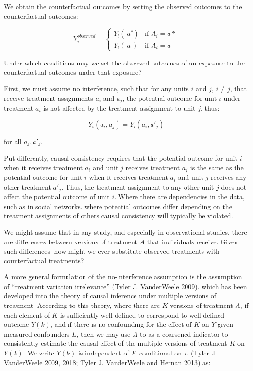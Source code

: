 \documentclass[
  singlecolumn]{report}
\begin{document}
We obtain the counterfactual outcomes by setting the observed outcomes
to the counterfactual outcomes:

\[
Y^{observed}_i = 
\begin{cases} 
Y_i(~a^*) & \text{if } A_i = a* \\
Y_i(~a~) & \text{if } A_i = a
\end{cases}
\]

Under which conditions may we set the observed outcomes of an exposure
to the counterfactual outcomes under that exposure?

First, we must assume no interference, such that for any units \(i\) and
\(j\), \(i \neq j\), that receive treatment assignments \(a_i\) and
\(a_j\), the potential outcome for unit \(i\) under treatment \(a_i\) is
not affected by the treatment assignment to unit \(j\), thus:

\[Y_i(a_i, a_j) = Y_i(a_i, a'_j)\]

for all \(a_j, a'_j\).

Put differently, causal consistency requires that the potential outcome
for unit \(i\) when it receives treatment \(a_i\) and unit \(j\)
receives treatment \(a_j\) is the same as the potential outcome for unit
\(i\) when it receives treatment \(a_i\) and unit \(j\) receives any
other treatment \(a'_j\). Thus, the treatment assignment to any other
unit \(j\) does not affect the potential outcome of unit \(i\). Where
there are dependencies in the data, such as in social networks, where
potential outcomes differ depending on the treatment assignments of
others causal consistency will typically be violated.

We might assume that in any study, and especially in observational
studies, there are differences between versions of treatment \(A\) that
individuals receive. Given such differences, how might we ever
substitute observed treatments with counterfactual treatments?

A more general formulation of the no-interference assumption is the
assumption of ``treatment variation irrelevance''
(\protect\hyperlink{ref-vanderweele2009}{Tyler J. VanderWeele 2009}),
which has been developed into the theory of causal inference under
multiple versions of treatment. According to this theory, where there
are \(K\) versions of treatment \(A\), if each element of \(K\) is
sufficiently well-defined to correspond to well-defined outcome
\(Y(k)\), and if there is no confounding for the effect of \(K\) on
\(Y\) given measured confounders \(L\), then we may use \(A\) to as a
coarsened indicator to consistently estimate the causal effect of the
multiple versions of treatment \(K\) on \(Y(k)\). We write \(Y(k)\) is
independent of \(K\) conditional on \(L\)
(\protect\hyperlink{ref-vanderweele2009}{Tyler J. VanderWeele 2009},
\protect\hyperlink{ref-vanderweele2018}{2018};
\protect\hyperlink{ref-vanderweele2013}{Tyler J. VanderWeele and Hernan
2013}) as:
\end{document}
